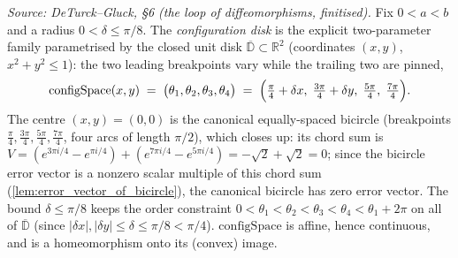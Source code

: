 \begin{definition}

  \label{def:configuration_space}
  \textit{Source: DeTurck--Gluck, §6 (the loop of diffeomorphisms, finitised).}
  Fix $0 < a < b$ and a radius $0 < \delta \le \pi/8$. The \emph{configuration
  disk} is the explicit two-parameter family parametrised by the closed unit disk
  $\overline{\mathbb{D}} \subset \mathbb{R}^2$ (coordinates $(x,y)$, $x^2+y^2 \le
  1$): the two leading breakpoints vary while the trailing two are pinned,
  \[
    \mathrm{configSpace}(x,y) \;=\;
      \bigl(\theta_1,\theta_2,\theta_3,\theta_4\bigr)
      \;=\;\Bigl(\tfrac{\pi}{4} + \delta x,\;
                 \tfrac{3\pi}{4} + \delta y,\;
                 \tfrac{5\pi}{4},\;\tfrac{7\pi}{4}\Bigr).
  \]
  The centre $(x,y)=(0,0)$ is the canonical equally-spaced bicircle (breakpoints
  $\tfrac{\pi}{4},\tfrac{3\pi}{4},\tfrac{5\pi}{4},\tfrac{7\pi}{4}$, four arcs of
  length $\pi/2$), which closes up: its chord sum is $V = (e^{3\pi i/4} - e^{\pi
  i/4}) + (e^{7\pi i/4} - e^{5\pi i/4}) = -\sqrt2 + \sqrt2 = 0$; since the bicircle
  error vector is a nonzero scalar multiple of this chord sum
  (\cref{lem:error_vector_of_bicircle}), the canonical bicircle has zero error
  vector. The
  bound $\delta \le \pi/8$ keeps the order constraint $0 < \theta_1 < \theta_2 <
  \theta_3 < \theta_4 < \theta_1 + 2\pi$ on all of $\overline{\mathbb{D}}$ (since
  $|\delta x|, |\delta y| \le \delta \le \pi/8 < \pi/4$). $\mathrm{configSpace}$ is
  affine, hence continuous, and is a homeomorphism onto its (convex) image.
\end{definition}

